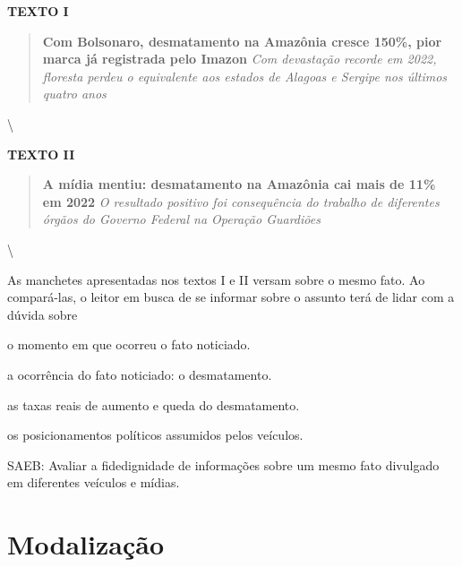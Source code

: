 \textbf{TEXTO I}

\begin{quote}
\textbf{Com Bolsonaro, desmatamento na Amazônia cresce 150\%, pior marca
já registrada pelo Imazon} \emph{Com devastação recorde em 2022,
floresta perdeu o equivalente aos estados de Alagoas e Sergipe nos
últimos quatro anos}
\end{quote}

\textbackslash {}

\textbf{TEXTO II}

\begin{quote}
\textbf{A mídia mentiu: desmatamento na Amazônia cai mais de 11\% em
2022} \emph{O resultado positivo foi consequência do trabalho de
diferentes órgãos do Governo Federal na Operação Guardiões}
\end{quote}

\textbackslash {}

As manchetes apresentadas nos textos I e II versam sobre o mesmo fato.
Ao compará-las, o leitor em busca de se informar sobre o assunto terá de
lidar com a dúvida sobre

\begin{escolha}
\item o momento em que ocorreu o fato noticiado.

\item a ocorrência do fato noticiado: o desmatamento.

\item as taxas reais de aumento e queda do desmatamento.

\item os posicionamentos políticos assumidos pelos veículos.
\end{escolha}

SAEB: Avaliar a fidedignidade de informações sobre um mesmo fato
divulgado em diferentes veículos e mídias.

\chapter{Modalização}

